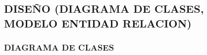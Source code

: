 \subsection{DISEÑO (DIAGRAMA DE CLASES, MODELO ENTIDAD RELACION)}
\subsubsection{DIAGRAMA DE CLASES}